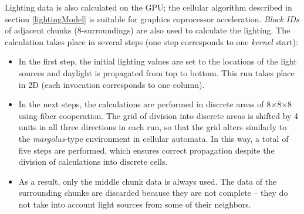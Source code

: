 Lighting data is also calculated on the GPU; the cellular algorithm described in section \ref{lightingModel} is suitable for graphics coprocessor acceleration. \textit{Block IDs} of adjacent chunks (8-surroundings) are also used to calculate the lighting. The calculation takes place in several steps (one step corresponds to one \textit{kernel} start):
\begin{itemize}
	\item In the first step, the initial lighting values are set to the locations of the light sources and daylight is propagated from top to bottom. This run takes place in 2D (each invocation corresponds to one column).
	\item In the next steps, the calculations are performed in discrete areas of 8×8×8 using fiber cooperation. The grid of division into discrete areas is shifted by 4 units in all three directions in each run, so that the grid alters similarly to the \textit{margolus}-type environment in cellular automata. In this way, a total of five steps are performed, which ensures correct propagation despite the division of calculations into discrete cells.
	\item As a result, only the middle chunk data is always used. The data of the surrounding chunks are discarded because they are not complete -- they do not take into account light sources from some of their neighbors.
\end{itemize}

